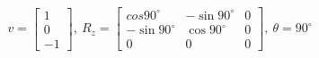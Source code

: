 \documentclass[preview]{standalone}
\begin{document}
\begin{align*}
v = \begin{bmatrix}
                        1\\
                        0\\
                        -1
                        \end{bmatrix}, \ 
                        R_z = \begin{bmatrix}
                        cos90^\circ & -\sin90^\circ & 0\\
                        -\sin90^\circ & \cos90^\circ & 0 \\
                        0 & 0 & 0
                        \end{bmatrix}, \ 
                        \theta = 90^\circ
\end{align*}
\end{document}

